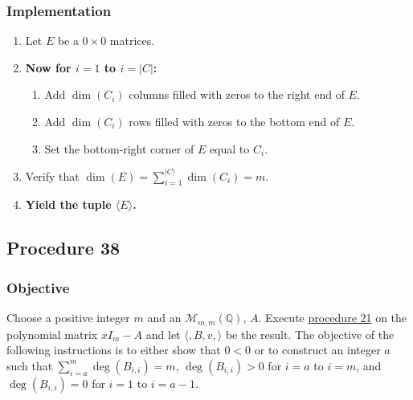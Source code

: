 \documentclass[twocolumn]{article}
\begin{document}
			\subsubsection{Implementation}
				\begin{enumerate}
					\item Let $E$ be a $0\times 0$ matrices.
					\item \textbf{Now for $i=1$ to $i=\lvert C\rvert$:}
					\begin{enumerate}
						\item Add $\dim(C_i)$ columns filled with zeros to the right end of $E$.
						\item Add $\dim(C_i)$ rows filled with zeros to the bottom end of $E$.
						\item Set the bottom-right corner of $E$ equal to $C_i$.
					\end{enumerate}
					\item Verify that $\dim(E)=\sum_{i=1}^{\lvert C\rvert}\dim(C_i)=m$.
					\item \textbf{Yield the tuple $\langle E\rangle$.}
				\end{enumerate}
		\subsection{Procedure 38}\label{sec:procedure 38}
			\subsubsection{Objective}
				Choose a positive integer $m$ and an $\mathcal{M}_{m,m}(\mathbb{Q})$, $A$. Execute \hyperref[sec:procedure 21]{procedure 21} on the polynomial matrix $xI_m-A$ and let $\langle ,B,v,\rangle$ be the result. The objective of the following instructions is to either show that $0<0$ or to construct an integer $a$ such that $\sum_{i=a}^m\deg(B_{i,i})=m$, $\deg(B_{i,i})>0$ for $i=a$ to $i=m$, and $\deg(B_{i,i})=0$ for $i=1$ to $i=a-1$.
\end{document}
